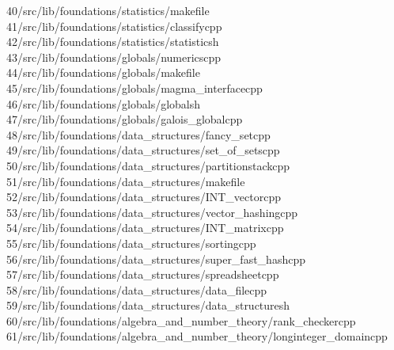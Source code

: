 \begin{tabbing}
40\>/src/lib/foundations/statistics/makefile\\[0pt]
41\>/src/lib/foundations/statistics/classifycpp\\[0pt]
42\>/src/lib/foundations/statistics/statisticsh\\[0pt]
43\>/src/lib/foundations/globals/numericscpp\\[0pt]
44\>/src/lib/foundations/globals/makefile\\[0pt]
45\>/src/lib/foundations/globals/magma\_interfacecpp\\[0pt]
46\>/src/lib/foundations/globals/globalsh\\[0pt]
47\>/src/lib/foundations/globals/galois\_globalcpp\\[0pt]
48\>/src/lib/foundations/data\_structures/fancy\_setcpp\\[0pt]
49\>/src/lib/foundations/data\_structures/set\_of\_setscpp\\[0pt]
50\>/src/lib/foundations/data\_structures/partitionstackcpp\\[0pt]
51\>/src/lib/foundations/data\_structures/makefile\\[0pt]
52\>/src/lib/foundations/data\_structures/INT\_vectorcpp\\[0pt]
53\>/src/lib/foundations/data\_structures/vector\_hashingcpp\\[0pt]
54\>/src/lib/foundations/data\_structures/INT\_matrixcpp\\[0pt]
55\>/src/lib/foundations/data\_structures/sortingcpp\\[0pt]
56\>/src/lib/foundations/data\_structures/super\_fast\_hashcpp\\[0pt]
57\>/src/lib/foundations/data\_structures/spreadsheetcpp\\[0pt]
58\>/src/lib/foundations/data\_structures/data\_filecpp\\[0pt]
59\>/src/lib/foundations/data\_structures/data\_structuresh\\[0pt]
60\>/src/lib/foundations/algebra\_and\_number\_theory/rank\_checkercpp\\[0pt]
61\>/src/lib/foundations/algebra\_and\_number\_theory/longinteger\_domaincpp\\[0pt]

\end{tabbing}

